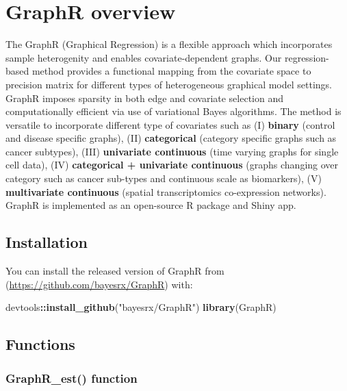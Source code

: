 \documentclass[
]{article}
\author{}
\date{\vspace{-2.5em}}
\newenvironment{Shaded}{\begin{snugshade}}{\end{snugshade}}
\newcommand{\FunctionTok}[1]{\textcolor[rgb]{0.13,0.29,0.53}{\textbf{#1}}}
\newcommand{\NormalTok}[1]{#1}
\newcommand{\SpecialCharTok}[1]{\textcolor[rgb]{0.81,0.36,0.00}{\textbf{#1}}}
\newcommand{\StringTok}[1]{\textcolor[rgb]{0.31,0.60,0.02}{#1}}
\begin{document}
\hypertarget{graphr-overview}{%
\section{GraphR overview}\label{graphr-overview}}

The GraphR (Graphical Regression) is a flexible approach which
incorporates sample heterogenity and enables covariate-dependent graphs.
Our regression-based method provides a functional mapping from the
covariate space to precision matrix for different types of heterogeneous
graphical model settings. GraphR imposes sparsity in both edge and
covariate selection and computationally efficient via use of variational
Bayes algorithms. The method is versatile to incorporate different type
of covariates such as (I) \textbf{binary} (control and disease specific
graphs), (II) \textbf{categorical} (category specific graphs such as
cancer subtypes), (III) \textbf{univariate continuous} (time varying
graphs for single cell data), (IV) \textbf{categorical + univariate
continuous} (graphs changing over category such as cancer sub-types and
continuous scale as biomarkers), (V) \textbf{multivariate continuous}
(spatial transcriptomics co-expression networks). GraphR is implemented
as an open-source R package and Shiny app.

\hypertarget{installation}{%
\subsection{Installation}\label{installation}}

You can install the released version of GraphR from
(\url{https://github.com/bayesrx/GraphR}) with:

\begin{Shaded}
\begin{Highlighting}[]
\NormalTok{devtools}\SpecialCharTok{::}\FunctionTok{install\_github}\NormalTok{(}\StringTok{"bayesrx/GraphR"}\NormalTok{)}
\FunctionTok{library}\NormalTok{(GraphR)}
\end{Highlighting}
\end{Shaded}

\hypertarget{functions}{%
\subsection{Functions}\label{functions}}

\hypertarget{graphr_est-function}{%
\subsubsection{GraphR\_est() function}\label{graphr_est-function}}
\end{document}
